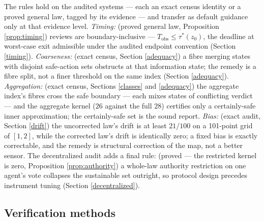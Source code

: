 \documentclass[10pt,twocolumn]{article}
\theoremstyle{definition}
\begin{document}
The rules hold on the audited systems --- each an exact census identity or a proved general law, tagged by its evidence --- and transfer as default guidance only at that evidence level. \emph{Timing:} (proved general law, Proposition \ref{prop:timing}) reviews are boundary-inclusive ---
\(T_{\mathrm{obs}} \le \tau^{*}(z_0)\), the deadline at worst-case exit admissible under the audited endpoint convention (Section \ref{timing}). \emph{Coarseness:} (exact census, Section \ref{adequacy}) a fibre
merging states with disjoint safe-action sets obstructs at that
information state; the remedy is a fibre split, not a finer threshold
on the same index (Section \ref{adequacy}). \emph{Aggregation:} (exact census, Sections \ref{classes} and \ref{adequacy}) the aggregate index's fibres cross the safe boundary --- each mixes states of conflicting verdict --- and the aggregate kernel (\(26\) against the full \(28\)) certifies only a certainly-safe inner approximation; the certainly-safe set is the sound report.
\emph{Bias:} (exact audit, Section \ref{drift}) the uncorrected law's drift is at least \(21/100\) on a
101-point grid of \([1,2]\), while the corrected law's drift is
identically zero; a fixed bias is exactly correctable, and the remedy is
structural correction of the map, not a better sensor. The decentralized audit adds a final rule: (proved --- the restricted kernel is zero, Proposition \ref{prop:authority}) a whole-law authority restriction on one agent's vote collapses the sustainable set outright, so protocol
design precedes instrument tuning (Section \ref{decentralized}).

\subsection{Verification methods}\label{methods}
\end{document}
